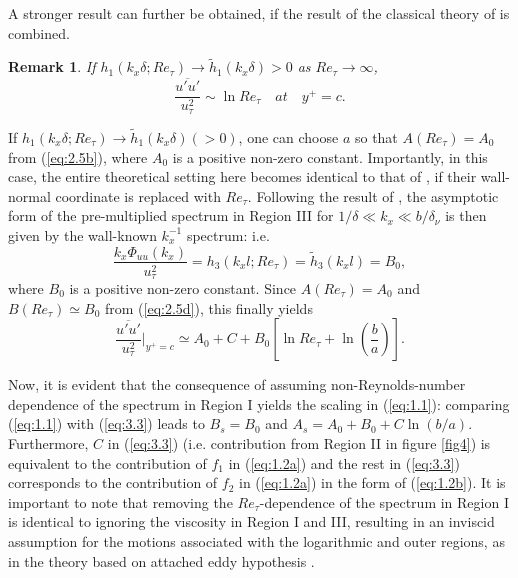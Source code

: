 \documentclass{jfm}
\newtheorem{remark}{Remark}
\begin{document}
A stronger result can further be obtained, if the result of the classical theory of \cite{Perry1986} is combined.
\begin{remark}\label{st:2}
\textit{If $h_1(k_x \delta; Re_\tau) \rightarrow \tilde{h}_1(k_x \delta)>0$ as $Re_\tau \rightarrow \infty$,
\begin{equation}
\frac{\overline{u'u'}}{u_\tau^2} \sim \ln Re_{\tau} \quad at \quad y^+=c.
\end{equation}
}
\end{remark}
If $h_1(k_x \delta; Re_\tau) \rightarrow \tilde{h}_1(k_x \delta)(>0)$, one can choose $a$ so that $A(Re_\tau)=A_0$ from (\ref{eq:2.5b}), where $A_0$ is a positive non-zero constant. Importantly, in this case, the entire theoretical setting here becomes identical to that of \cite{Perry1986}, if their wall-normal coordinate is replaced with $Re_\tau$. Following the result of \cite{Perry1986}, the asymptotic form of the pre-multiplied spectrum in Region III for $1/\delta \ll k_x\ll b/\delta_\nu$ is then given by the wall-known $k_x^{-1}$ spectrum: i.e.
\begin{equation}
\frac{k_x\Phi_{uu}(k_x)}{u_\tau^2}=h_3(k_x l; Re_\tau) = \tilde{h}_3(k_x l)={B_0},
\end{equation}
where $B_0$ is a positive non-zero constant. Since $A(Re_\tau)=A_0$ and $B(Re_\tau) \simeq B_0$ from (\ref{eq:2.5d}), this finally yields
\begin{equation}\label{eq:3.3}
\frac{\overline{u'u'}}{u_\tau^2}\Big|_{y^+=c} \simeq A_0+C+B_0\left[\ln Re_\tau+\ln \left(\frac{b}{a}\right)\right].
\end{equation}

Now, it is evident that the consequence of assuming non-Reynolds-number dependence of the spectrum in Region I yields the scaling in (\ref{eq:1.1}): comparing (\ref{eq:1.1}) with (\ref{eq:3.3}) leads to $B_s=B_0$ and $A_s=A_0+B_0+C \ln (b/a)$. Furthermore, $C$ in (\ref{eq:3.3}) (i.e. contribution from Region II in figure \ref{fig4}) is equivalent to the contribution of $f_1$ in (\ref{eq:1.2a}) and the rest in (\ref{eq:3.3}) corresponds to the contribution of $f_2$ in (\ref{eq:1.2a}) in the form of (\ref{eq:1.2b}). It is important to note that removing the $Re_\tau$-dependence of the spectrum in Region I is identical to ignoring the viscosity in Region I and III, resulting in an inviscid assumption for the motions associated with the logarithmic and outer regions, as in the theory based on attached eddy hypothesis \cite[]{Marusic2003}. %
\end{document}
